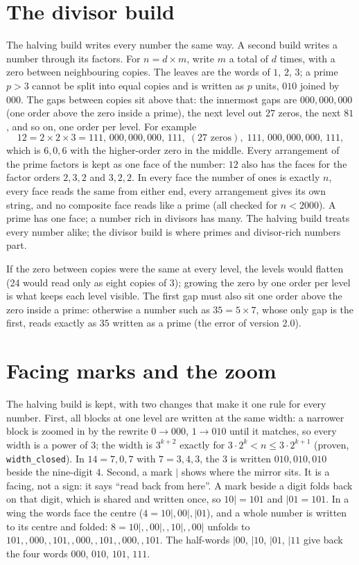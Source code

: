 \documentclass[11pt]{article}
\begin{document}
\section{The divisor build}
The halving build writes every number the same way. A second build writes a number through its factors. For $n = d\times m$, write $m$ a total of $d$ times, with a zero between neighbouring copies. The leaves are the words of $1$, $2$, $3$; a prime $p>3$ cannot be split into equal copies and is written as $p$ units, $010$ joined by $000$. The gaps between copies sit above that: the innermost gaps are $000,000,000$ (one order above the zero inside a prime), the next level out $27$ zeros, the next $81$, and so on, one order per level. For example
\[ 12 = 2\times2\times3 = 111,\,000,000,000,\,111,\;(27\text{ zeros}),\;111,\,000,000,000,\,111, \]
which is $6,0,6$ with the higher-order zero in the middle. Every arrangement of the prime factors is kept as one face of the number: $12$ also has the faces for the factor orders $2,3,2$ and $3,2,2$. In every face the number of ones is exactly $n$, every face reads the same from either end, every arrangement gives its own string, and no composite face reads like a prime (all checked for $n<2000$). A prime has one face; a number rich in divisors has many. The halving build treats every number alike; the divisor build is where primes and divisor-rich numbers part.

If the zero between copies were the same at every level, the levels would flatten (24 would read only as eight copies of $3$); growing the zero by one order per level is what keeps each level visible. The first gap must also sit one order above the zero inside a prime: otherwise a number such as $35 = 5\times7$, whose only gap is the first, reads exactly as $35$ written as a prime (the error of version 2.0).

\section{Facing marks and the zoom}
The halving build is kept, with two changes that make it one rule for every number. First, all blocks at one level are written at the same width: a narrower block is zoomed in by the rewrite $0\to000$, $1\to010$ until it matches, so every width is a power of $3$; the width is $3^{k+2}$ exactly for $3\cdot2^k < n \le 3\cdot2^{k+1}$ (proven, \texttt{width\_closed}). In $14 = 7,0,7$ with $7 = 3,4,3$, the $3$ is written $010,010,010$ beside the nine-digit $4$. Second, a mark $|$ shows where the mirror sits. It is a facing, not a sign: it says ``read back from here''. A mark beside a digit folds back on that digit, which is shared and written once, so $10| = 101$ and $|01 = 101$. In a wing the words face the centre ($4 = 10|,00|,|01$), and a whole number is written to its centre and folded: $8 = 10|,,00|,,10|,,00|$ unfolds to $101,,000,,101,,000,,101,,000,,101$. The half-words $|00$, $|10$, $|01$, $|11$ give back the four words $000$, $010$, $101$, $111$.
\end{document}
